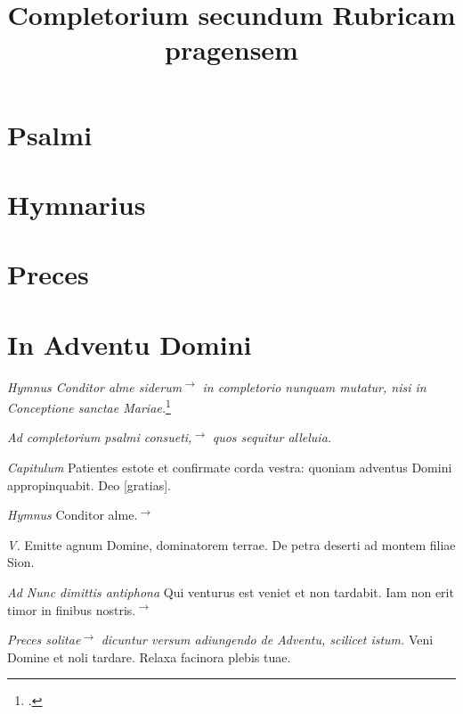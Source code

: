 \documentclass[a5paper, 12pt]{book}
\title{Completorium secundum Rubricam pragensem}
\newcommand{\rubrica}[1]{\textit{#1}}
\newcommand{\incipit}[1]{\textup{#1}}
\newcommand{\hymnus}[1]{%
  \phantomsection
  \label{hym:#1}
  }
\newcommand{\quickref}[1]{\quickrefFormat{\pageref{#1}}}
\newcommand{\quickrefFormat}[1]{\textsuperscript{\textup{$\rightarrow$#1}}}
\newcommand{\editorial}[1]{[#1]}
\begin{document}
\maketitle

\chapter{Psalmi}
\label{psalmi}


\chapter{Hymnarius}

\hymnus{conditor}

\chapter{Preces}
\label{preces}


\chapter{In Adventu Domini}

\rubrica{Hymnus \incipit{Conditor alme siderum}\quickref{hym:conditor}
  in completorio
  nunquam mutatur, nisi in Conceptione sanctae Mariae.}\footcite[83r]{bp1502}
\vspace{3mm}

\rubrica{Ad completorium psalmi consueti,\quickref{psalmi}
  quos sequitur \incipit{alleluia.}}

\rubrica{Capitulum}
Patientes estote et confirmate corda vestra:
quoniam adventus Domini appropinquabit.
Deo \editorial{gratias}.

\rubrica{Hymnus}
Conditor alme.\quickref{hym:conditor}

\rubrica{V.}
Emitte agnum Domine, dominatorem terrae.
De petra deserti ad montem filiae Sion.

\rubrica{Ad Nunc dimittis antiphona}
Qui venturus est veniet et non tardabit. Iam non erit timor in finibus nostris.\quickref{can:adventus_quiventurus}

\rubrica{Preces solitae\quickref{preces}
  dicuntur versum adiungendo de Adventu, scilicet istum.}
Veni Domine et noli tardare. Relaxa facinora plebis tuae.
\end{document}
